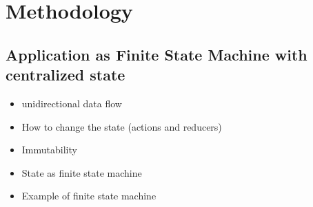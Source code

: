 \section{Methodology}\label{sec:methodology}

\subsection{Application as Finite State Machine with centralized state}\label{sec:central_state}

\begin{itemize}
 \item unidirectional data flow
 \item How to change the state (actions and reducers)
 \item Immutability
 \item State as finite state machine
 \item Example of finite state machine
\end{itemize}



